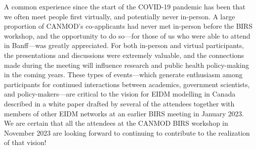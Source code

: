 A common experience since the start of the COVID-19 pandemic has been
that we often meet people first virtually, and potentially never
in-person.  A large proportion of CANMOD's co-applicants had never met
in-person before the BIRS workshop, and the opportunity to do so---for
those of us who were able to attend in Banff---was greatly
appreciated.  For both in-person and virtual participants, the
presentations and discussions were extremely valuable, and the
connections made during the meeting will influence research and public
health policy-making in the coming years.  These types of
events---which generate enthusiasm among participants for continued
interactions between academics, government scientists, and
policy-makers---are critical to the vision for EIDM modelling in Canada
described in a white paper \cite{Lewi+23} drafted by several of the
attendees together with members of other EIDM networks at an earlier
BIRS meeting in January 2023.  We are certain that all the attendees
at the CANMOD BIRS workshop in November 2023 are looking forward to
continuing to contribute to the realization of that vision!


